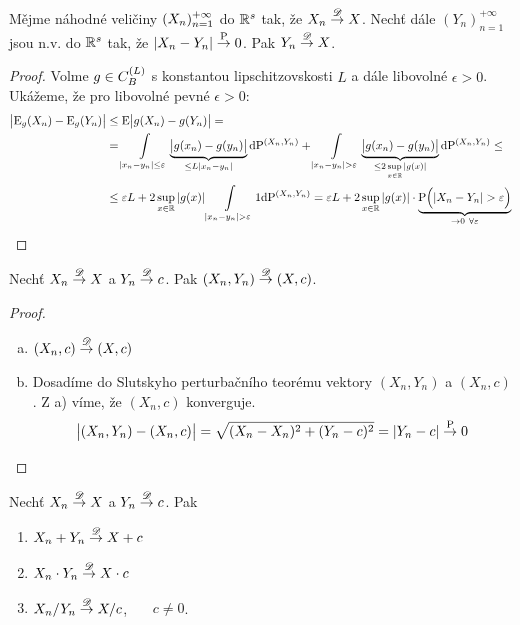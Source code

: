 \begin{theorem}
	Mějme náhodné veličiny $(X_n)_{n=1}^{+\infty}$ do $\mathbb{R}^s$ tak, že $X_n\stackrel{\mathscr{D}}{\to} X$. Nechť dále $(Y_n)_{n=1}^{+\infty}$ jsou n.v. do $\mathbb{R}^s$ tak, že $|X_n-Y_n|\stackrel{\mathrm{P}}{\to} 0$. Pak $Y_n\stackrel{\mathscr{D}}{\to} X$.\begin{proof}
		Volme $g\in C_B^{(L)}$ s konstantou lipschitzovskosti $L$ a dále libovolné $\epsilon>0$. Ukážeme, že pro libovolné pevné $\epsilon>0$:
		\[
		\begin{split}
		 \bigl| \E _g(X_n)-\E _g(Y_n) \bigr|&\leq \E \bigl| g(X_n)-g(Y_n) \bigr|= \\ &=\int\limits_{|x_n-y_n|\leq\epsilon}\underbrace{\bigl| g(x_n)-g(y_n) \bigr|}_{\leq L|x_n-y_n|}\dif\PP^{(X_n,Y_n)}+\int\limits_{|x_n-y_n|>\epsilon}\underbrace{\bigl| g(x_n)-g(y_n) \bigr|}_{\leq 2\sup\limits_{x\in\R}|g(x)|}\dif\PP^{(X_n,Y_n)}\leq \\ &\leq \epsilon L+2\sup\limits_{x\in\R}|g(x)|\int\limits_{|x_n-y_n|>\epsilon}1\dif\PP^{(X_n,Y_n)}=\epsilon L+2\sup\limits_{x\in\R}|g(x)|\cdot \underbrace{\PP\Bigl( |X_n-Y_n|>\epsilon \Bigr)}_{\to 0~\forall\epsilon} 
		\end{split}
		\]
	\end{proof}
\end{theorem}
\begin{lemma}
	Nechť $X_n\stackrel{\mathscr{D}}{\to} X$ a $Y_n\stackrel{\mathscr{D}}{\to} c$. Pak $(X_n,Y_n)\stackrel{\mathscr{D}}{\to} (X,c)$.
	\begin{proof}
		\begin{enumerate}[a)]
			\item $(X_n,c)\stackrel{\mathscr{D}}{\to} (X,c)$
			\item Dosadíme do Slutskyho perturbačního teorému vektory $(X_n,Y_n)$ a $(X_n,c)$. Z a) víme, že $(X_n,c)$ konverguje. 
			$$ \bigl| (X_n,Y_n)-(X_n,c) \bigr|=\sqrt{(X_n-X_n)^2+(Y_n-c)^2}=|Y_n-c|\stackrel{\mathrm{P}}{\to} 0 $$
		\end{enumerate}
	\end{proof}
\end{lemma}
\begin{theorem}
	Nechť $X_n\stackrel{\mathscr{D}}{\to} X$ a $Y_n\stackrel{\mathscr{D}}{\to} c$. Pak \begin{enumerate}
		\item $X_n+Y_n\stackrel{\mathscr{D}}{\to} X+c$
		\item $X_n\cdot Y_n\stackrel{\mathscr{D}}{\to} X\cdot c$
		\item $X_n/Y_n\stackrel{\mathscr{D}}{\to} X/c$,~~~ $c\neq 0$.
		
	\end{enumerate}
\end{theorem}
